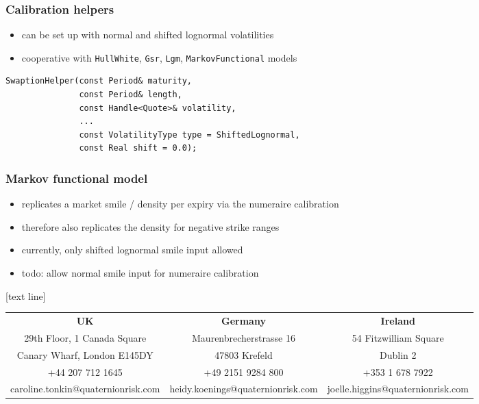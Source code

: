 \documentclass[10pt,German]{beamer}
\begin{document}
\begin{frame}[fragile]
\frametitle{Calibration helpers}
\begin{itemize}
\item can be set up with normal and shifted lognormal volatilities
\item cooperative with \verb+HullWhite+, \verb+Gsr+, \verb+Lgm+, \verb+MarkovFunctional+ models
\end{itemize}
\begin{verbatim}
SwaptionHelper(const Period& maturity,
               const Period& length,
               const Handle<Quote>& volatility,
               ...
               const VolatilityType type = ShiftedLognormal,
               const Real shift = 0.0);
\end{verbatim}
\end{frame}

\begin{frame}[fragile]
\frametitle{Markov functional model}
\begin{itemize}
\item replicates a market smile / density per expiry via the numeraire calibration
\item therefore also replicates the density for negative strike ranges
\item currently, only shifted lognormal smile input allowed
\item todo: allow normal smile input for numeraire calibration
\end{itemize}
\end{frame}

[text line]{}

\begin{frame}{}

{\tiny
\color{white}
\begin{center}
\hspace{-0.49cm}
\begin{tabular}{ccc}
{\bf UK}                           & {\bf Germany}           &  {\bf Ireland} \\
29th Floor, 1 Canada Square        & Maurenbrecherstrasse 16 & 54 Fitzwilliam Square\\
Canary Wharf, London E145DY        & 47803 Krefeld           & Dublin 2\\
+44 207 712 1645                   & +49 2151 9284 800       & +353 1 678 7922\\
caroline.tonkin@quaternionrisk.com & heidy.koenings@quaternionrisk.com & joelle.higgins@quaternionrisk.com\\
\end{tabular}
\end{center}
}

\end{frame}
\end{document}
